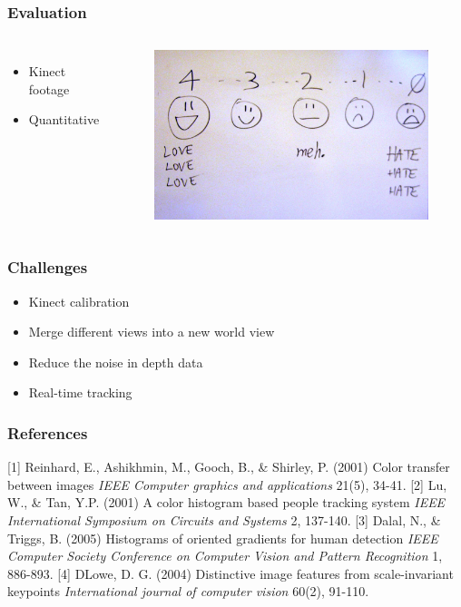 \documentclass{beamer}
\begin{document}
\begin{frame}
\frametitle{Evaluation}
\begin{columns}[c]
\begin{itemize}
	\item Kinect footage
	\item Quantitative
\end{itemize}
\begin{figure}
\includegraphics[width=0.8\linewidth]{evaluation}
\end{figure}
\end{columns}
\end{frame}

\begin{frame}
\frametitle{Challenges}
\begin{itemize}
	\item Kinect calibration
	\item Merge different views into a new world view
	\item Reduce the noise in depth data
	\item Real-time tracking
\end{itemize}
\end{frame}

\begin{frame}
\frametitle{References}
\footnotesize{
\begin{thebibliography}{4}
 [1] Reinhard, E., Ashikhmin, M., Gooch, B., \& Shirley, P. (2001)
\newblock Color transfer between images
\newblock \emph{IEEE Computer graphics and applications} 21(5), 34-41.
 [2] Lu, W., \& Tan, Y.P. (2001)
\newblock A color histogram based people tracking system
\newblock \emph{IEEE International Symposium on Circuits and Systems} 2, 137-140.
 [3] Dalal, N., \& Triggs, B. (2005)
\newblock Histograms of oriented gradients for human detection
\newblock \emph{IEEE Computer Society Conference on Computer Vision and Pattern Recognition} 1, 886-893.
 [4] DLowe, D. G. (2004)
\newblock Distinctive image features from scale-invariant keypoints
\newblock \emph{International journal of computer vision} 60(2), 91-110.
\end{thebibliography}
}
\end{frame}
\end{document}

